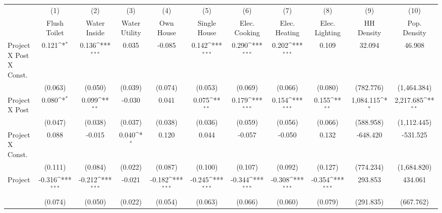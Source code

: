 {
\def\sym#1{\ifmmode^{#1}\else\(^{#1}\)\fi}
\begin{tabular}{l*{10}{c}}
\hline\hline
                &\multicolumn{1}{c}{(1)}&\multicolumn{1}{c}{(2)}&\multicolumn{1}{c}{(3)}&\multicolumn{1}{c}{(4)}&\multicolumn{1}{c}{(5)}&\multicolumn{1}{c}{(6)}&\multicolumn{1}{c}{(7)}&\multicolumn{1}{c}{(8)}&\multicolumn{1}{c}{(9)}&\multicolumn{1}{c}{(10)}\\
                &\multicolumn{1}{c}{Flush Toilet}&\multicolumn{1}{c}{Water Inside}&\multicolumn{1}{c}{Water Utility}&\multicolumn{1}{c}{Own House}&\multicolumn{1}{c}{Single House}&\multicolumn{1}{c}{Elec. Cooking}&\multicolumn{1}{c}{Elec. Heating}&\multicolumn{1}{c}{Elec. Lighting}&\multicolumn{1}{c}{HH Density}&\multicolumn{1}{c}{Pop. Density}\\
\hline
Project X Post X Const.&    0.121\sym{*}  &    0.136\sym{***}&    0.035         &   -0.085         &    0.142\sym{***}&    0.290\sym{***}&    0.202\sym{***}&    0.109         &   32.094         &   46.908         \\
                &  (0.063)         &  (0.050)         &  (0.039)         &  (0.074)         &  (0.053)         &  (0.069)         &  (0.066)         &  (0.080)         &(782.776)         &(1,464.384)         \\
[1em]
Project X Post  &    0.080\sym{*}  &    0.099\sym{**} &   -0.030         &    0.041         &    0.075\sym{**} &    0.179\sym{***}&    0.154\sym{***}&    0.155\sym{**} &1,084.115\sym{*}  &2,217.685\sym{**} \\
                &  (0.047)         &  (0.038)         &  (0.037)         &  (0.038)         &  (0.036)         &  (0.059)         &  (0.056)         &  (0.066)         &(588.958)         &(1,112.445)         \\
[1em]
Project X Const.&    0.088         &   -0.015         &    0.040\sym{*}  &    0.120         &    0.044         &   -0.057         &   -0.050         &    0.132         & -648.420         & -531.525         \\
                &  (0.111)         &  (0.084)         &  (0.022)         &  (0.087)         &  (0.100)         &  (0.107)         &  (0.092)         &  (0.127)         &(774.234)         &(1,684.820)         \\
[1em]
Project         &   -0.316\sym{***}&   -0.212\sym{***}&   -0.021         &   -0.182\sym{***}&   -0.245\sym{***}&   -0.344\sym{***}&   -0.308\sym{***}&   -0.354\sym{***}&  293.853         &  434.061         \\
                &  (0.074)         &  (0.050)         &  (0.022)         &  (0.054)         &  (0.063)         &  (0.066)         &  (0.060)         &  (0.079)         &(291.835)         &(667.762)         \\

\end{tabular}}
